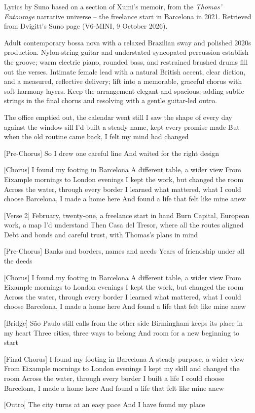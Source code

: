 
\begin{notes}
Lyrics by Suno based on a section of Xumi's memoir, from the \emph{Thomas' Entourage} narrative universe -- the freelance start in Barcelona in 2021. Retrieved from Dvigitt's Suno page (V6-MINI, 9 October 2026).
\end{notes}
\begin{style}
Adult contemporary bossa nova with a relaxed Brazilian sway and polished 2020s production. Nylon-string guitar and understated syncopated percussion establish the groove; warm electric piano, rounded bass, and restrained brushed drums fill out the verses. Intimate female lead with a natural British accent, clear diction, and a measured, reflective delivery; lift into a memorable, graceful chorus with soft harmony layers. Keep the arrangement elegant and spacious, adding subtle strings in the final chorus and resolving with a gentle guitar-led outro.
\end{style}
\begin{lyrics}
[Verse 1]
The office emptied out, the calendar went still
I saw the shape of every day against the window sill
I’d built a steady name, kept every promise made
But when the old routine came back, I felt my mind had changed

[Pre-Chorus]
So I drew one careful line
And waited for the right design

[Chorus]
I found my footing in Barcelona
A different table, a wider view
From Eixample mornings to London evenings
I kept the work, but changed the room
Across the water, through every border
I learned what mattered, what I could choose
Barcelona, I made a home here
And found a life that felt like mine anew

[Verse 2]
February, twenty-one, a freelance start in hand
Burn Capital, European work, a map I’d understand
Then Casa del Tresor, where all the routes aligned
Debt and bonds and careful trust, with Thomas’s plans in mind

[Pre-Chorus]
Banks and borders, names and needs
Years of friendship under all the deeds

[Chorus]
I found my footing in Barcelona
A different table, a wider view
From Eixample mornings to London evenings
I kept the work, but changed the room
Across the water, through every border
I learned what mattered, what I could choose
Barcelona, I made a home here
And found a life that felt like mine anew

[Bridge]
São Paulo still calls from the other side
Birmingham keeps its place in my heart
Three cities, three ways to belong
And room for a new beginning to start

[Final Chorus]
I found my footing in Barcelona
A steady purpose, a wider view
From Eixample mornings to London evenings
I kept my skill and changed the room
Across the water, through every border
I built a life I could choose
Barcelona, I made a home here
And found a life that felt like mine anew

[Outro]
The city turns at an easy pace
And I have found my place
\end{lyrics}

